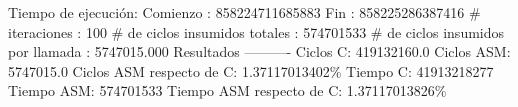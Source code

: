 \documentclass[10pt, a4paper]{article}
\begin{document}
\begin{itemize}
Tiempo de ejecución:\newline
  Comienzo                          : 858224711685883\newline
  Fin                               : 858225286387416\newline
  \# iteraciones                     : 100\newline
  \# de ciclos insumidos totales     : 574701533\newline
  \# de ciclos insumidos por llamada : 5747015.000\newline
\newline
Resultados\newline
----------
Ciclos C:                 419132160.0\newline
Ciclos ASM:               5747015.0\newline
Ciclos ASM respecto de C: 1.37117013402\%\newline
Tiempo C:                 41913218277\newline
Tiempo ASM:               574701533\newline
Tiempo ASM respecto de C: 1.37117013826\%\newline


\end{itemize}
\end{document}
